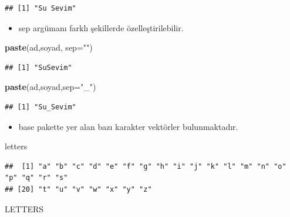 \documentclass[
  oneside]{book}
\newenvironment{Shaded}{\begin{snugshade}}{\end{snugshade}}
\newcommand{\AttributeTok}[1]{\textcolor[rgb]{0.13,0.29,0.53}{#1}}
\newcommand{\FunctionTok}[1]{\textcolor[rgb]{0.13,0.29,0.53}{\textbf{#1}}}
\newcommand{\NormalTok}[1]{#1}
\newcommand{\StringTok}[1]{\textcolor[rgb]{0.31,0.60,0.02}{#1}}
\providecommand{\tightlist}{%
  \setlength{\itemsep}{0pt}\setlength{\parskip}{0pt}}
\begin{document}
\begin{verbatim}
## [1] "Su Sevim"
\end{verbatim}

\begin{itemize}
\tightlist
\item
  sep argümanı farklı şekillerde özelleştirilebilir.
\end{itemize}

\begin{Shaded}
\begin{Highlighting}[]
\FunctionTok{paste}\NormalTok{(ad,soyad, }\AttributeTok{sep=}\StringTok{""}\NormalTok{)}
\end{Highlighting}
\end{Shaded}

\begin{verbatim}
## [1] "SuSevim"
\end{verbatim}

\begin{Shaded}
\begin{Highlighting}[]
\FunctionTok{paste}\NormalTok{(ad,soyad,}\AttributeTok{sep=}\StringTok{"\_"}\NormalTok{)}
\end{Highlighting}
\end{Shaded}

\begin{verbatim}
## [1] "Su_Sevim"
\end{verbatim}

\begin{itemize}
\tightlist
\item
  base pakette yer alan bazı karakter vektörler bulunmaktadır.
\end{itemize}

\begin{Shaded}
\begin{Highlighting}[]
\NormalTok{letters}
\end{Highlighting}
\end{Shaded}

\begin{verbatim}
##  [1] "a" "b" "c" "d" "e" "f" "g" "h" "i" "j" "k" "l" "m" "n" "o" "p" "q" "r" "s"
## [20] "t" "u" "v" "w" "x" "y" "z"
\end{verbatim}

\begin{Shaded}
\begin{Highlighting}[]
\NormalTok{LETTERS}
\end{Highlighting}
\end{Shaded}
\end{document}

